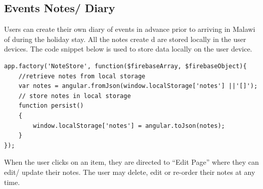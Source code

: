 \paragraph{}

\subsection{Events Notes/ Diary}
Users can create their own diary of events in advance prior to arriving in Malawi of during the holiday stay. All the notes create d are stored locally in the user devices. The code snippet below is used to store data locally on the user device.

\begin{verbatim}
app.factory('NoteStore', function($firebaseArray, $firebaseObject){
	//retrieve notes from local storage
	var notes = angular.fromJson(window.localStorage['notes'] ||'[]');
	// store notes in local storage
	function persist()
	{
		window.localStorage['notes'] = angular.toJson(notes);
	}   
});
\end{verbatim}
 
When the user clicks on an item, they are directed to “Edit Page” where they can edit/ update their notes. The user may delete, edit or re-order their notes at any time.

